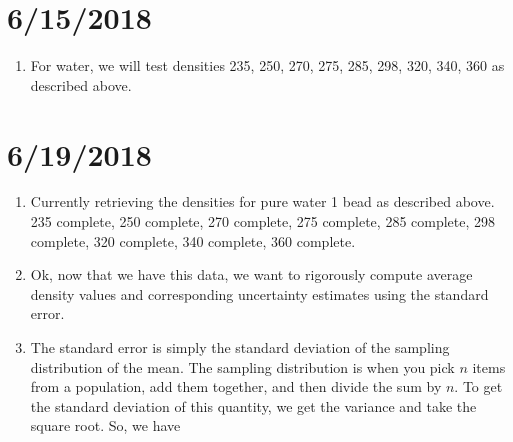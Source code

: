 \documentclass[12pt,reqno]{amsart}
\numberwithin{equation}{section}
\begin{document}
\section{6/15/2018}
\begin{enumerate}
\item For water, we will test densities 235, 250, 270, 275, 285, 298, 320, 340, 360 as described above.  
\end{enumerate}

\section{6/19/2018}
\begin{enumerate}
\item Currently retrieving the densities for pure water 1 bead as described above.  235 complete, 250 complete, 270 complete, 275 complete, 285 complete, 298 complete, 320 complete, 340 complete, 360 complete.  
\item Ok, now that we have this data, we want to rigorously compute average density values and corresponding uncertainty estimates using the standard error.
\item The standard error is simply the standard deviation of the sampling distribution of the mean.  The sampling distribution is when you pick $n$ items from a population, add them together, and then divide the sum by $n$.  To get the standard deviation of this quantity, we get the variance and take the square root.  So, we have 


\end{enumerate}
\end{document}
